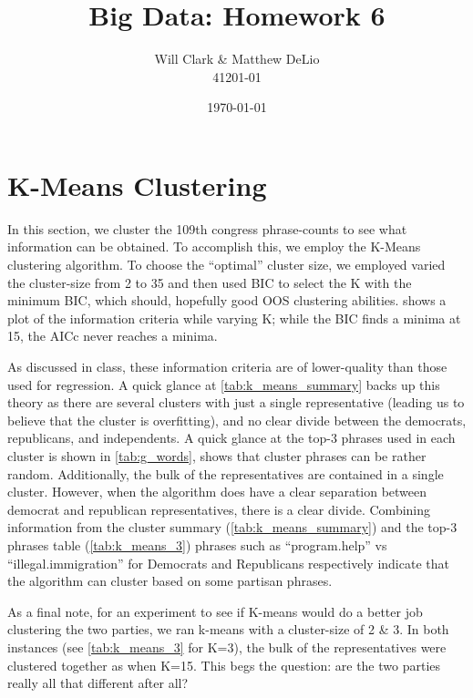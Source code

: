 \documentclass[11pt, fleqn]{article}
\begin{document}
\title{Big Data: Homework 6}
\author{Will Clark \& Matthew DeLio \\ 41201-01}
\date{\today}
\maketitle

\section{K-Means Clustering} \label{sec:kmeans}

In this section, we cluster the 109th congress phrase-counts to see what information can be obtained.  To accomplish this, we employ the K-Means clustering algorithm.  To choose the ``optimal'' cluster size, we employed varied the cluster-size from 2 to 35 and then used BIC to select the K with the minimum BIC, which should, hopefully good OOS clustering abilities.   shows a plot of the information criteria while varying K; while the BIC finds a minima at 15, the AICc never reaches a minima.

As discussed in class, these information criteria are of lower-quality than those used for regression.  A quick glance at \vref{tab:k_means_summary} backs up this theory as there are several clusters with just a single representative (leading us to believe that the cluster is overfitting), and no clear divide between the democrats, republicans, and independents.  A quick glance at the top-3 phrases used in each cluster is shown in \vref{tab:g_words}, shows that cluster phrases can be rather random.  Additionally, the bulk of the representatives are contained in a single cluster.  However, when the algorithm does have a clear separation between democrat and republican representatives, there is a clear divide.  Combining information from the cluster summary (\cref{tab:k_means_summary}) and the top-3 phrases table (\cref{tab:k_means_3}) phrases such as ``program.help'' vs ``illegal.immigration'' for Democrats and Republicans respectively indicate that the algorithm can cluster based on some partisan phrases.

As a final note, for an experiment to see if K-means would do a better job clustering the two parties, we ran k-means with a cluster-size of 2 \& 3.  In both instances (see \vref{tab:k_means_3} for K=3), the bulk of the representatives were clustered together as when K=15.  This begs the question: are the two parties really all that different after all?
\end{document}
